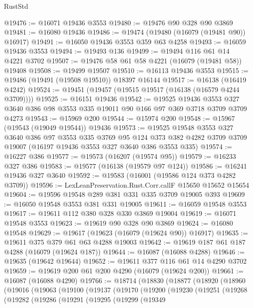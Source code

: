 \begin{lexlean}{RustStd}
\begin{coremodule}
@19476 := @16071 @19436 @3553
@19480 := @19476 @90 @328 @90 @3869
@19481 := @16080 @19436
@19486 := @19474 (@19480 (@16079 (@19481 @90)) @16917)
@19491 := @16050 @19436 @3553 @359 @63 @4258
@19493 := @16059 @19436 @3553
@19494 := @19493 @136
@19499 := @19494 @116 @61 @14 @4221 @3702
@19507 := @19476 @58 @61 @58 @4221 (@16079 (@19481 @58)) @19408
@19508 := @19499 @19507
@19510 := @16113 @19436 @3553
@19515 := @19486 (@19491 (@19508 @19510)) @18397 @16144
@19517 := @16138 (@16419 @4242)
@19524 := @19451 (@19457 (@19515 @19517 (@16138 (@16579 @4244 @3709))))
@19525 := @16151 @19436
@19542 := @19525
    @19436
    @3553
    @327
    @3640
    @386
    @98
    @3553
    @335
    @19011
    @90
    @166
    @97
    @369
    @3718
    @3709
    @3709
    @4273
@19543 := @15969 @200
@19544 := @15974 @200
@19548 := @15967 (@19543 (@19049 @19544)) @19436
@19573 := @19525
    @19548
    @3553
    @327
    @3640
    @386
    @97
    @3553
    @335
    @3769
    @95
    @124
    @373
    @382
    @4282
    @3709
    @3709
    @19007
    (@16197 @19436 @3553 @327 @3640 @386 @3553 @335)
@19574 := @16227 @386
@19577 := @19573 (@16207 (@19574 @95))
@19579 := @16233 @327 @386
@19583 := @19577 (@16138 (@19579 @97 @124))
@19586 := @16241 @19436 @327 @3640
@19592 := @19583 (@16001 (@19586 @124 @373 @4282 @3709))
@19596 := LexLeanPreservation.Rust.Corr.callF @15650 @15652 @15654
@19604 := @19596 @19548 @289 @381 @331 @335 @3709 @19005 @393
@19609 := @16050 @19548 @3553 @381 @331 @19005
@19611 := @16059 @19548 @3553
@19617 := @19611 @112 @380 @328 @330 @3869 @19004
@19619 := @16071 @19548 @3553
@19623 := @19619 @90 @328 @90 @3869
@19624 := @16080 @19548
@19629 := @19617 (@19623 (@16079 (@19624 @90)) @16917)
@19635 := @19611 @375 @379 @61 @63 @4288 @19003
@19642 := @19619 @187 @61 @187 @4288 (@16079 (@19624 @187))
@19644 := @16087 (@16088 @4288)
@19646 := @19635 (@19642 @19644)
@19652 := @19611 @377 @116 @61 @14 @4290 @3702
@19659 := @19619 @200 @61 @200 @4290 (@16079 (@19624 @200))
@19661 := @16087 (@16088 @4290)
@19766 := @18714
    (@18830
      (@18877
        (@18920
          (@18960
            (@19016
              (@19063
                (@19100
                  (@19137
                    (@19170
                      (@19200
                        (@19230
                          (@19251
                            (@19268
                              (@19282
                                (@19286
                                  (@19291
                                    (@19295
                                      (@19299
                                        (@19349

\end{coremodule}
\end{lexlean}
